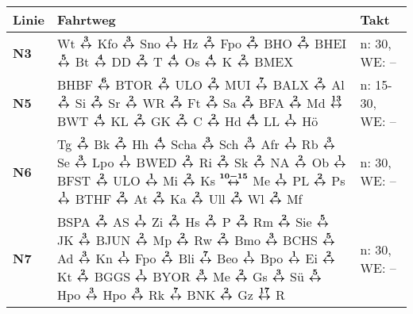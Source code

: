 \begin{minipage}[t]{0.05\textwidth}
\phantom{Tor}
\end{minipage}
\begin{minipage}[t]{0.45\textwidth}
\begin{tabular}{>{\bfseries}L{1.2cm}L{9.0cm}L{3.0cm}}
{\bfseries Linie} & {\bfseries Fahrtweg} & {\bfseries Takt} \\
\hline
\nbus{} N3    & Wt $\xarwe{3}$ Kfo $\xarwe{3}$ Sno $\xarwe{1}$ Hz $\xarwe{2}$ Fpo $\xarwe{2}$ BHO $\xarwe{2}$ BHEI $\xarwe{5}$ Bt $\xarwe{4}$ DD $\xarwe{2}$ T $\xarwe{4}$ Os       %
                $\xarwe{4}$ K $\xarwe{2}$ BMEX                                                                                                                                      & n: 30, WE: --              \\
\nbus{} N5    & BHBF $\xarwe{6}$ BTOR $\xarwe{2}$ ULO $\xarwe{2}$ MUI $\xarwe{7}$ BALX $\xarwe{2}$ Al $\xarwe{2}$ Si $\xarwe{2}$ Sr $\xarwe{2}$ WR $\xarwe{2}$ Ft $\xarwe{2}$ Sa $\xarwe{2}$ BFA $\xarwe{2}$ Md $\xarwe{13}$ BWT $\xarwe{4}$ KL     %
                $\xarwe{2}$ GK $\xarwe{2}$ C $\xarwe{2}$ Hd $\xarwe{4}$ LL $\xarwe{1}$ Hö
                & n: 15-30, WE: --           \\
\nbus{} N6    & Tg $\xarwe{2}$ Bk $\xarwe{2}$ Hh $\xarwe{4}$ Scha $\xarwe{3}$ Sch $\xarwe{3}$ Afr $\xarwe{1}$ Rb $\xarwe{3}$ Se $\xarwe{3}$ Lpo $\xarwe{1}$ BWED $\xarwe{2}$ Ri     %
                $\xarwe{2}$ Sk $\xarwe{2}$ NA $\xarwe{2}$ Ob $\xarwe{1}$ BFST $\xarwe{2}$ ULO $\xarwe{1}$ Mi $\xarwe{2}$ Ks $\xarwe{10-15}$ Me $\xarwe{1}$ PL $\xarwe{2}$ Ps        %
                $\xarwe{1}$ BTHF $\xarwe{2}$ At $\xarwe{2}$ Ka $\xarwe{2}$ Ull $\xarwe{2}$ Wl $\xarwe{2}$ Mf                                                                        & n: 30, WE: --              \\
\nbus{} N7    & BSPA $\xarwe{2}$ AS $\xarwe{1}$ Zi $\xarwe{2}$ Hs $\xarwe{2}$ P $\xarwe{2}$ Rm $\xarwe{2}$ Sie $\xarwe{5}$ JK $\xarwe{3}$ BJUN $\xarwe{2}$ Mp $\xarwe{2}$ Rw        %
                $\xarwe{2}$ Bmo $\xarwe{3}$ BCHS $\xarwe{5}$ Ad $\xarwe{3}$ Kn $\xarwe{1}$ Fpo $\xarwe{2}$ Bli $\xarwe{7}$ Beo $\xarwe{1}$ Bpo $\xarwe{1}$ Ei $\xarwe{2}$ Kt        %
                $\xarwe{2}$ BGGS $\xarwe{1}$ BYOR $\xarwe{3}$ Me $\xarwe{2}$ Gs $\xarwe{3}$ Sü $\xarwe{5}$ Hpo $\xarwe{3}$ Hpo $\xarwe{3}$ Rk $\xarwe{7}$ BNK $\xarwe{2}$ Gz        %
                $\xarwe{17}$ R                                                                                                                                                      & n: 30, WE: --              \\

\end{tabular}
\end{minipage}
